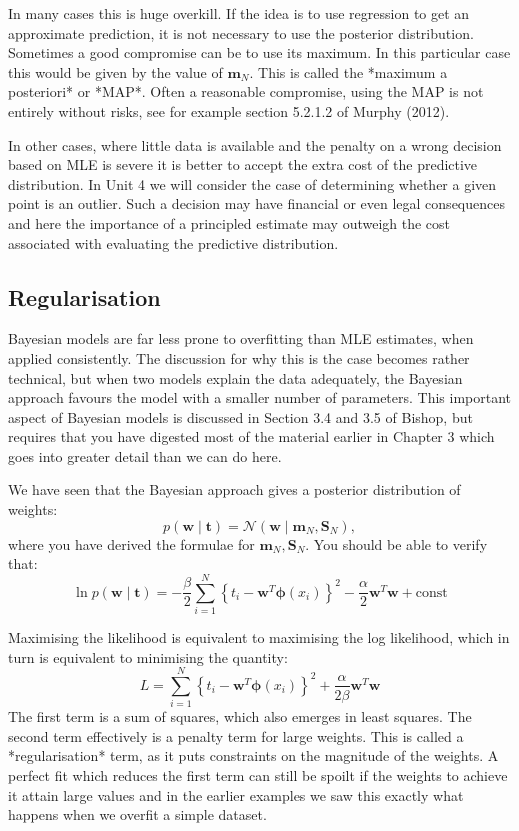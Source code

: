 In many cases this is huge overkill. If the idea is to use regression to get an approximate prediction, it is not necessary to use the posterior distribution. Sometimes a good compromise can be to use its maximum. In this particular case this would be given by the value of $\boldsymbol{m}_N$.  This is called the *maximum a posteriori* or *MAP*. Often a reasonable compromise, using the MAP is not entirely without risks, see for example section 5.2.1.2 of Murphy (2012).

In other cases, where little data is available and the penalty on a wrong decision based on MLE is severe it is better to accept the extra cost of the predictive distribution. In Unit 4 we will consider the case of determining whether a given point is an outlier. Such a decision may have financial or even legal consequences and here the importance of a principled estimate may outweigh the cost associated with evaluating the predictive distribution.


\subsection{Regularisation}

Bayesian models are far less prone to overfitting than MLE estimates, when applied consistently. The discussion for why this is the case becomes rather technical, but when two models explain the data adequately, the Bayesian approach favours the model with a smaller number of parameters.  This important aspect of Bayesian models is discussed in Section 3.4 and 3.5 of Bishop, but requires that you have digested most of the material earlier in Chapter 3 which goes into greater detail than we can do here.

We have seen that the Bayesian approach gives a posterior distribution of weights:
$$
p(\boldsymbol{w} \mid \boldsymbol{t} ) = \mathcal{N} ( \boldsymbol{w} \mid \boldsymbol{m}_N, \boldsymbol{S}_N),
$$
where you have derived the formulae for $\boldsymbol{m}_{N}, \boldsymbol{S}_N$. You should be able to verify that:
$$
\ln p(\boldsymbol{w} \mid \boldsymbol{t} ) = -\frac{\beta}{2} \sum^N_{i=1} \left\{ t_i - \boldsymbol{w}^T\boldsymbol{\phi}(x_i) \right\}^2  - \frac{\alpha}{2} \boldsymbol{w}^T \boldsymbol{w} + \mbox{const}
$$ 

Maximising the likelihood is equivalent to maximising the log likelihood, which in turn is equivalent to minimising
the quantity:
$$
L = \sum^N_{i=1} \left\{ t_i - \boldsymbol{w}^T\boldsymbol{\phi}(x_i) \right\}^2  + \frac{\alpha}{2\beta} \boldsymbol{w}^T \boldsymbol{w} 
$$
The first term is a sum of squares, which also emerges in least squares. The second term effectively is a penalty term for large weights. This is called a *regularisation* term, as it puts constraints on the magnitude of the weights. A perfect fit which reduces the first term can still be spoilt if the weights to achieve it attain large values and in the earlier examples we saw this exactly what happens when we overfit a simple dataset.

